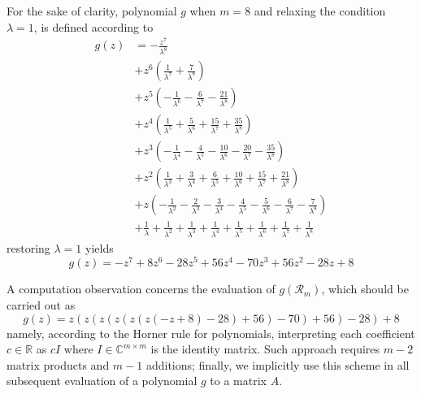 For the sake of clarity, polynomial $g$ when $m=8$ and relaxing the condition $\lambda=1$, is defined according to 
\begin{displaymath}
\begin{split}
g{\left (z \right )} &= - \frac{z^{7}}{\lambda^{8}} \\
&+ z^{6} \left(\frac{1}{\lambda^{7}} + \frac{7}{\lambda^{8}}\right) \\
&+ z^{5} \left(- \frac{1}{\lambda^{6}} - \frac{6}{\lambda^{7}} - \frac{21}{\lambda^{8}}\right) \\
&+ z^{4} \left(\frac{1}{\lambda^{5}} + \frac{5}{\lambda^{6}} + \frac{15}{\lambda^{7}} + \frac{35}{\lambda^{8}}\right) \\
&+ z^{3} \left(- \frac{1}{\lambda^{4}} - \frac{4}{\lambda^{5}} - \frac{10}{\lambda^{6}} - \frac{20}{\lambda^{7}} - \frac{35}{\lambda^{8}}\right) \\
&+ z^{2} \left(\frac{1}{\lambda^{3}} + \frac{3}{\lambda^{4}} + \frac{6}{\lambda^{5}} + \frac{10}{\lambda^{6}} + \frac{15}{\lambda^{7}} + \frac{21}{\lambda^{8}}\right) \\
&+ z \left(- \frac{1}{\lambda^{2}} - \frac{2}{\lambda^{3}} - \frac{3}{\lambda^{4}} - \frac{4}{\lambda^{5}} - \frac{5}{\lambda^{6}} - \frac{6}{\lambda^{7}} - \frac{7}{\lambda^{8}}\right) \\
&+ \frac{1}{\lambda} + \frac{1}{\lambda^{2}} + \frac{1}{\lambda^{3}} + \frac{1}{\lambda^{4}} + \frac{1}{\lambda^{5}} + \frac{1}{\lambda^{6}} + \frac{1}{\lambda^{7}} + \frac{1}{\lambda^{8}}
\end{split}
\end{displaymath}
restoring $\lambda=1$ yields \[g{\left (z \right )} = - z^{7} + 8 z^{6} - 28 z^{5} + 56 z^{4} - 70 z^{3} + 56 z^{2} - 28 z + 8\]

A computation observation concerns the evaluation of $g(\mathcal{R}_{m})$, which should be carried out as
\begin{displaymath}
g(z) = z \left(z \left(z \left(z \left(z \left(z \left(- z + 8\right) - 28\right) + 56\right) - 70\right) + 56\right) - 28\right) + 8
\end{displaymath}
namely, according to the Horner rule for polynomials, interpreting each coefficient $c\in\mathbb{R}$ as $cI$ where $I\in\mathbb{C}^{m\times m}$ is the
identity matrix. Such approach requires $m-2$ matrix products and $m-1$ additions; finally, we implicitly use this scheme in all subsequent evaluation of a polynomial $g$ to a matrix $A$.



